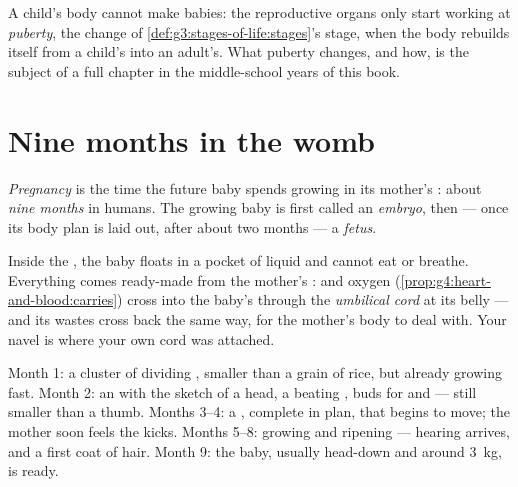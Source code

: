 \begin{remark}\label{rem:g5:human-reproduction:adults}
A child's body cannot make babies: the reproductive organs
only start working at \emph{puberty}, the change of
\cref{def:g3:stages-of-life:stages}'s  stage, when
the body rebuilds itself from a child's into an adult's. What
puberty changes, and how, is the subject of a full chapter in
the middle-school years of this book.
\end{remark}

\section{Nine months in the womb}

\begin{definition}[Pregnancy]\label{def:g5:human-reproduction:pregnancy}
\emph{Pregnancy} is the time the future baby
spends growing in its mother's : about \emph{nine months}
in humans. The growing baby is first called an
\emph{embryo}, then --- once its body plan is
laid out, after about two months --- a
\emph{fetus}.
\end{definition}

\begin{proposition}\label{prop:g5:human-reproduction:cord}
Inside the , the baby floats in a pocket of liquid and
cannot eat or breathe. Everything comes ready-made from the
mother's :  and oxygen
(\cref{prop:g4:heart-and-blood:carries}) cross into the
baby's  through the
\emph{umbilical cord} at its belly ---
and its wastes cross back the same way, for the mother's body
to deal with. Your navel is where your own cord was attached.
\end{proposition}
\admitted

\begin{example}\label{ex:g5:human-reproduction:timetable}
Month 1: a cluster of dividing , smaller than a grain of
rice, but already growing fast. Month 2: an  with the
sketch of a head, a beating , buds for  and  ---
still smaller than a thumb. Months 3--4: a , complete in
plan, that begins to move; the mother soon feels the kicks.
Months 5--8: growing and ripening --- hearing arrives, and a
first coat of hair. Month 9: the baby, usually head-down and
around \qty{3}{kg}, is ready.
\end{example}

